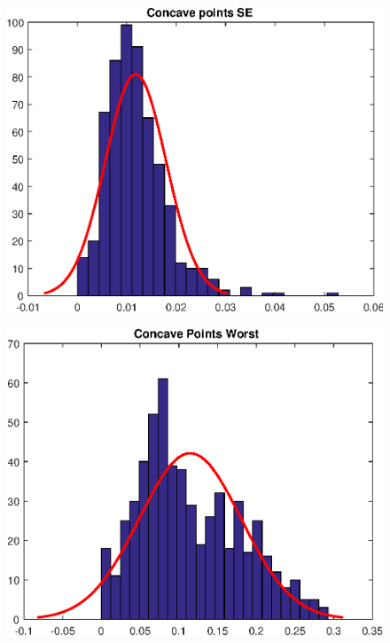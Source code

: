 \documentclass[11pt,a4paper]{article}
\numberwithin{equation}{section}
\begin{document}
\begin{itemize}
\begin{figure}[H]
\centering
\begin{minipage}{.5\textwidth}
  \centering
  \includegraphics[width=\linewidth]{./img/concave_points_se}
  \label{fig:test1}
\end{minipage}%
\begin{minipage}{.5\textwidth}
  \centering
  \includegraphics[width=\linewidth]{./img/concave_points_worst}
  \label{fig:test2}
\end{minipage}
\end{figure}



\end{itemize}
\end{document}
